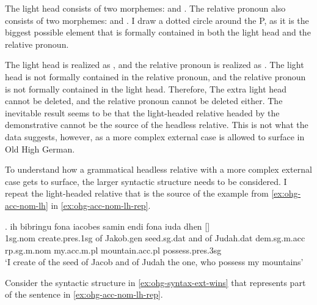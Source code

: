 The light head consists of two morphemes:  and .
The relative pronoun also consists of two morphemes:  and .
I draw a dotted circle around the P, as it is the biggest possible element that is formally contained in both the light head and the relative pronoun.

The light head is realized as , and the relative pronoun is realized as .
The light head is not formally contained in the relative pronoun, and the relative pronoun is not formally contained in the light head.
Therefore, The extra light head cannot be deleted, and the relative pronoun cannot be deleted either.
The inevitable result seems to be that the light-headed relative headed by the demonstrative cannot be the source of the headless relative.
This is not what the data suggests, however, as a more complex external case is allowed to surface in Old High German.

To understand how a grammatical headless relative with a more complex external case gets to surface, the larger syntactic structure needs to be considered. I repeat the light-headed relative that is the source of the example from \ref{ex:ohg-acc-nom-lh} in \ref{ex:ohg-acc-nom-lh-rep}.

\exg. ih bibringu fona iacobes samin endi fona iuda dhen []   \\
1\ac{sg}.\ac{nom} {create}.\ac{pres}.1\ac{sg}\scsub{[acc]} of Jakob.\ac{gen} seed.\ac{sg}.\ac{dat} and of Judah.\ac{dat} \ac{dem}.\ac{sg}.\ac{m}.\ac{acc} \ac{rp}.\ac{sg}.\ac{m}.\ac{nom} my.\ac{acc}.\ac{m}.\ac{pl} mountain.\ac{acc}.\ac{pl} possess.\ac{pres}.3\ac{sg}\scsub{[nom]}\\
`I create of the seed of Jacob and of Judah the one, who possess my mountains' \label{ex:ohg-acc-nom-lh-rep}

Consider the syntactic structure in \ref{ex:ohg-syntax-ext-wins} that represents part of the sentence in \ref{ex:ohg-acc-nom-lh-rep}.

